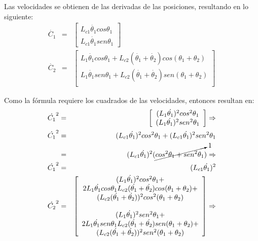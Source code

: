 \documentclass[11pt,spanish,lettersize]{article}
\begin{document}
Las velocidades se obtienen de las derivadas de las posiciones, resultando en lo siguiente:
\begin{eqnarray}
\dot{C_1}&=&\left[\begin{array}{c}
L_{c1}\dot{\theta_1}cos\theta_1\\
L_{c1}\dot{\theta_1}sen\theta_1
\end{array}\right]\\
\dot{C_2}&=&\left[\begin{array}{c}
L_1\dot{\theta_1}cos\theta_1+L_{c2}(\dot{\theta_1}+\dot{\theta_2})cos(\theta_1+\theta_2)\\
L_1\dot{\theta_1}sen\theta_1+L_{c2}(\dot{\theta_1}+\dot{\theta_2})sen(\theta_1+\theta_2)\\
\end{array}\right]
\end{eqnarray}

Como la f\'ormula requiere los cuadrados de las velocidades, entonces resultan en:
\begin{eqnarray}
\nonumber\dot{C_1}^2&=&\left[\begin{array}{c}
(L_1\dot{\theta_1})^2cos^2\theta_1\\
(L_1\dot{\theta_1})^2sen^2\theta_1
\end{array}\right]\Rightarrow\\
\nonumber\dot{C_1}^2&=&(L_{c1}\dot{\theta_1})^2cos^2\theta_1+(L_{c1}\dot{\theta_1})^2sen^2\theta_1\\
\nonumber&=&(L_{c1}\dot{\theta_1})^2(\cancelto{1}{cos^2\theta_1+sen^2\theta_1})\Rightarrow\\
\dot{C_1}^2&=&(L_{c1}\dot{\theta_1})^2\label{C12}\\
\nonumber\dot{C_2}^2&=&\left[\begin{array}{c}
(L_1\dot{\theta_1})^2cos^2\theta_1+\\
2L_1\dot{\theta_1}cos\theta_1L_{c2}(\dot{\theta_1}+\dot{\theta_2})cos(\theta_1+\theta_2)+\\
(L_{c2}(\dot{\theta_1}+\dot{\theta_2}))^2cos^2(\theta_1+\theta_2)\\ \\
(L_1\dot{\theta_1})^2sen^2\theta_1+\\
2L_1\dot{\theta_1}sen\theta_1L_{c2}(\dot{\theta_1}+\dot{\theta_2})sen(\theta_1+\theta_2)+\\
(L_{c2}(\dot{\theta_1}+\dot{\theta_2}))^2sen^2(\theta_1+\theta_2)
\end{array}\right]\Rightarrow
\end{eqnarray}
\end{document}
